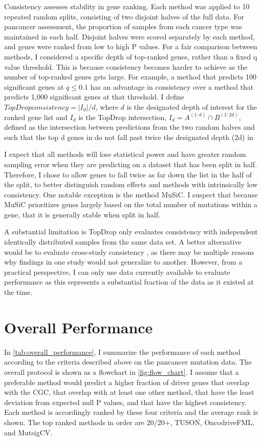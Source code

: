 Consistency assesses stability in gene ranking. Each method was applied to 10 repeated random splits, consisting of two disjoint halves of the full data. For pancancer assessment, the proportion of samples from each cancer type was maintained in each half. Disjoint halves were scored separately by each method, and genes were ranked from low to high P values. For a fair comparison between methods, I considered a specific depth of top-ranked genes, rather than a fixed q value threshold. This is because consistency becomes harder to achieve as the number of top-ranked genes gets large. For example, a method that predicts 100 significant genes at $q \leq 0.1$ has an advantage in consistency over a method that predicts 1,000 significant genes at that threshold. I define $TopDrop consistency=|I_d |/d$, where $d$ is the designated depth of interest for the ranked gene list and $I_d$ is the TopDrop intersection, $I_d=A^{(1:d)} \cap B^{(1:2d)}$, defined as the intersection between predictions from the two random halves  and  such that the top d genes in  do not fall past twice the designated depth (2d) in 

I expect that all methods will lose statistical power and have greater random sampling error when they are predicting on a dataset that has been split in half. Therefore, I chose to allow genes to fall twice as far down the list in the  half of the split, to better distinguish random effects and methods with intrinsically low consistency. One notable exception is the method MuSiC. I suspect that because MuSiC prioritizes genes largely based on the total number of mutations within a gene, that it is generally stable when split in half.

A substantial limitation is TopDrop only evaluates consistency with independent identically distributed samples from the same data set. A better alternative would be to evaluate cross-study consistency \cite{RN157}, as there may be multiple reasons why findings in one study would not generalize to another. However, from a practical perspective, I can only use data currently available to evaluate performance as this represents a substantial fraction of the data as it existed at the time.

\section{Overall Performance}

In \autoref{tab:overall_performance}, I summarize the performance of each method according to the criteria described above on the pancancer mutation data. The overall protocol is shown as a flowchart in \autoref{fig:flow_chart}. I assume that a preferable method would predict a higher fraction of driver genes that overlap with the CGC, that overlap with at least one other method, that have the least deviation from expected null P values, and that have the highest consistency. Each method is accordingly ranked by these four criteria and the average rank is shown. The top ranked methods in order are 20/20+, TUSON, OncodriveFML, and MutsigCV.

